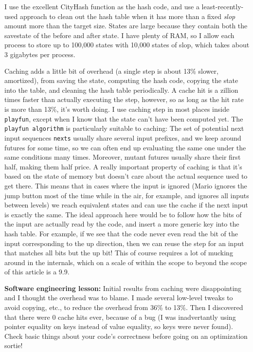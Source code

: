 \documentclass[twocolumn]{article}
\begin{document}
I use the excellent CityHash function\cite{CityHash} as the hash code,
and use a least-recently-used approach to clean out the hash table
when it has more than a fixed {\em slop} amount more than the target
size. States are large because they contain both the savestate of the
before and after state. I have plenty of RAM, so I allow each process
to store up to 100,000 states with 10,000 states of slop, which takes
about 3 gigabytes per process.

Caching adds a little bit of overhead (a single step is about 13\%
slower, amortized), from saving the state, computing the hash code,
copying the state into the table, and cleaning the hash table
periodically. A cache hit is a zillion times faster than actually
executing the step, however, so as long as the hit rate is more than
13\%, it's worth doing. I use caching step in most places inside {\tt
  playfun}, except when I know that the state can't have been computed
yet. The {\tt playfun algorithm} is particularly suitable to caching:
The set of potential next input sequences {\tt nexts} usually share
several input prefixes, and we keep around futures for some time, so
we can often end up evaluating the same one under the same conditions
many times. Moreover, mutant futures usually share their first half,
making them half price. A really important property of caching is that
it's based on the state of memory but doesn't care about the actual
sequence used to get there. This means that in cases where the input
is ignored (Mario ignores the jump button most of the time while in
the air, for example, and ignores all inputs between levels) we reach
equivalent states and can use the cache if the next input is exactly
the same. The ideal approach here would be to follow how the bits of
the input are actually read by the code, and insert a more generic key
into the hash table. For example, if we see that the code never even
read the bit of the input corresponding to the up direction, then we
can reuse the step for an input that matches all bits but the up bit!
This of course requires a lot of mucking around in the internals,
which on a scale of within the scope to beyond the scope of this
article is a 9.9.

{\bf Software engineering lesson:} Initial results from caching were
disappointing and I thought the overhead was to blame. I made several
low-level tweaks to avoid copying, etc., to reduce the overhead from
36\% to 13\%. Then I discovered that there were 0 cache hits ever,
because of a bug (I was inadvertantly using pointer equality on keys
instead of value equality, so keys were never found). Check basic
things about your code's correctness before going on an optimization
sortie!
\end{document}
